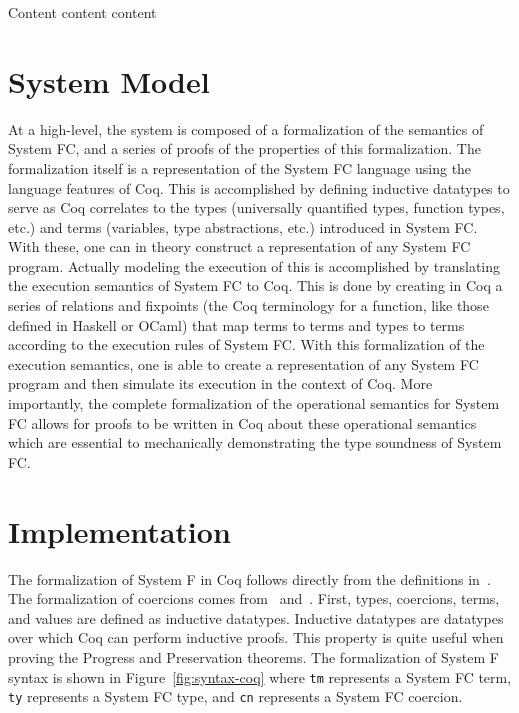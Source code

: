 \documentclass{sig-alternate}
\begin{document}
Content content content

\section{System Model}
\label{sec:model}
At a high-level, the system is composed of a formalization of the semantics of System FC, and a series of proofs of the properties of this formalization. The formalization itself is a representation of the System FC language using the language features of Coq. This is accomplished by defining inductive datatypes to serve as Coq correlates to the types (universally quantified types, function types, etc.) and terms (variables, type abstractions, etc.) introduced in System FC.  With these, one can in theory construct a representation of any System FC program. Actually modeling the execution of this is accomplished by translating the execution semantics of System FC to Coq. This is done by creating in Coq a series of relations and fixpoints (the Coq terminology for a function, like those defined in Haskell or OCaml) that map terms to terms and types to terms according to the execution rules of System FC. With this formalization of the execution semantics, one is able to create a representation of any System FC program and then simulate its execution in the context of Coq. More importantly, the complete formalization of the operational semantics for System FC allows for proofs to be written in Coq about these operational semantics which are essential to mechanically demonstrating the type soundness of System FC.

\section{Implementation}
\label{sec:implementation}

The formalization of System F in Coq follows directly from the definitions in~\cite{Pierce:TAPL}. The formalization of coercions comes from~\cite{Breitner:2014:SZC:2628136.2628141} and~\cite{DBLP:conf/tldi/YorgeyWCJVM12}. First, types, coercions, terms, and values are defined as inductive datatypes. Inductive datatypes are datatypes over which Coq can perform inductive proofs. This property is quite useful when proving the Progress and Preservation theorems. The formalization of System F syntax is shown in Figure~\ref{fig:syntax-coq} where \texttt{tm} represents a System FC term,  \texttt{ty} represents a System FC type, and \texttt{cn} represents a System FC coercion.
\end{document}
